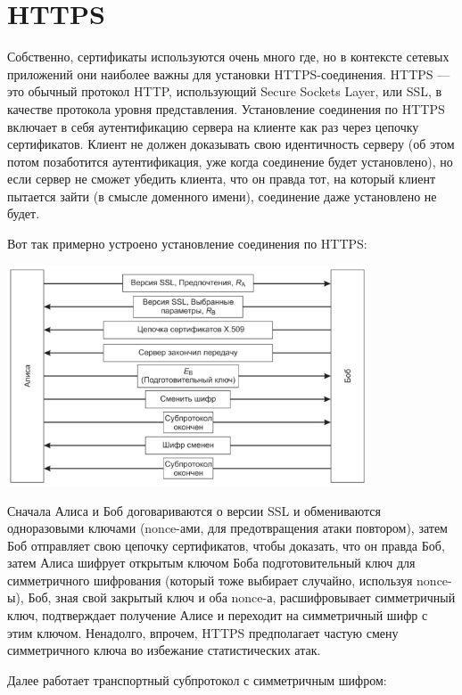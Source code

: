 \documentclass{../mcstext}
\begin{document}
\section{HTTPS}

Собственно, сертификаты используются очень много где, но в контексте сетевых приложений они наиболее важны для установки HTTPS-соединения. HTTPS --- это обычный протокол HTTP, использующий Secure Sockets Layer, или SSL, в качестве протокола уровня представления. Установление соединения по HTTPS включает в себя аутентификацию сервера на клиенте как раз через цепочку сертификатов. Клиент не должен доказывать свою идентичность серверу (об этом потом позаботится аутентификация, уже когда соединение будет установлено), но если сервер не сможет убедить клиента, что он правда тот, на который клиент пытается зайти (в смысле доменного имени), соединение даже установлено не будет.

Вот так примерно устроено установление соединения по HTTPS:

\begin{center}
    \includegraphics[width=0.8\textwidth]{ssl.png}
\end{center}

Сначала Алиса и Боб договариваются о версии SSL и обмениваются одноразовыми ключами (nonce-ами, для предотвращения атаки повтором), затем Боб отправляет свою цепочку сертификатов, чтобы доказать, что он правда Боб, затем Алиса шифрует открытым ключом Боба подготовительный ключ для симметричного шифрования (который тоже выбирает случайно, используя nonce-ы), Боб, зная свой закрытый ключ и оба nonce-а, расшифровывает симметричный ключ, подтверждает получение Алисе и переходит на симметричный шифр с этим ключом. Ненадолго, впрочем, HTTPS предполагает частую смену симметричного ключа во избежание статистических атак.

Далее работает транспортный субпротокол с симметричным шифром: 
\end{document}
